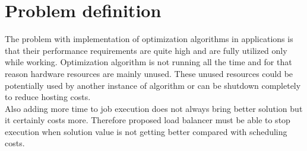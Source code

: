 
\chapter{Problem definition}\label{ch:problem-definition}

The problem with implementation of optimization algorithms in applications is that their
performance requirements are quite high and are fully utilized only while working.
Optimization algorithm is not running all the time and for that reason hardware resources are mainly unused.
These unused resources could be potentially used by another instance of algorithm
or can be shutdown completely to reduce hosting costs.\\
Also adding more time to job execution does not always bring better solution
but it certainly costs more.
Therefore proposed load balancer must be able to stop execution when solution value
is not getting better compared with scheduling costs.

